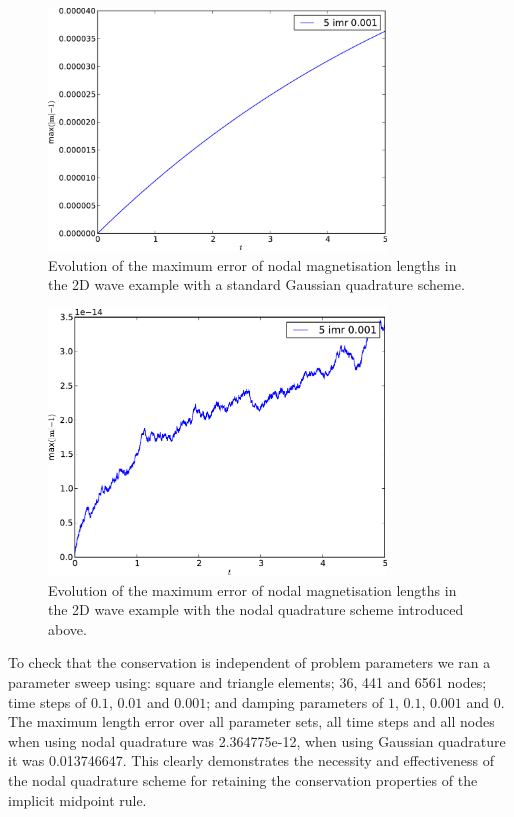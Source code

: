 \begin{figure}[\figpos]
  \centering
  \includegraphics[width=0.8\textwidth]{plots/2d_wave_solution_m_length/gauss-maxmathbfm-1vst.pdf}
  \caption{Evolution of the maximum error of nodal magnetisation lengths in the 2D wave example with a standard Gaussian quadrature scheme.}
  \label{fig:mean-ml-error-2d-gauss}
\end{figure}

\begin{figure}[\figpos]
  \centering
  \includegraphics[width=0.8\textwidth]{plots/2d_wave_solution_m_length/lnodal-maxmathbfm-1vst.pdf}
  \caption{Evolution of the maximum error of nodal magnetisation lengths in the 2D wave example with the nodal quadrature scheme introduced above.}
  \label{fig:mean-ml-error-2d-nodal}
\end{figure}

To check that the conservation is independent of problem parameters we ran a parameter sweep using: square and triangle elements; 36, 441 and 6561 nodes; time steps of $0.1$, $0.01$ and $0.001$; and damping parameters of $1$, $0.1$, $0.001$ and $0$.
The maximum length error over all parameter sets, all time steps and all nodes when using nodal quadrature was 2.364775e-12, when using Gaussian quadrature it was 0.013746647.
This clearly demonstrates the necessity and effectiveness of the nodal quadrature scheme for retaining the conservation properties of the implicit midpoint rule.



